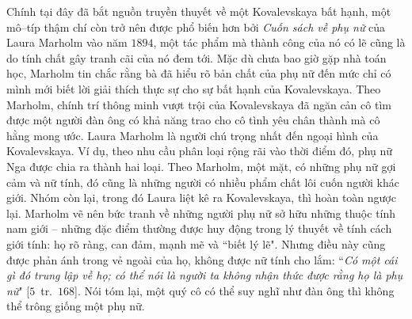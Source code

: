\begin{multicols}{2}
	Chính tại đây đã bắt nguồn truyền thuyết về một Kovalevskaya bất hạnh, một mô--típ thậm chí còn trở nên được phổ biến hơn bởi \textit{Cuốn sách về phụ nữ} của Laura Marholm vào năm $1894$, một tác phẩm mà thành công của nó có lẽ cũng là do tính chất gây tranh cãi của nó đem tới. Mặc dù chưa bao giờ gặp nhà toán học, Marholm tin chắc rằng bà đã hiểu rõ bản chất của phụ nữ đến mức chỉ có mình mới biết lời giải thích thực sự cho sự bất hạnh của Kovalevskaya. Theo Marholm, chính trí thông minh vượt trội của Kovalevskaya đã ngăn cản cô tìm được một người đàn ông có khả năng trao cho cô tình yêu chân thành mà cô hằng mong ước. Laura Marholm là người chú trọng nhất đến ngoại hình của Kovalevskaya. Ví dụ, theo nhu cầu phân loại rộng rãi vào thời điểm đó, phụ nữ Nga được chia ra thành hai loại. Theo Marholm, một mặt, có những phụ nữ gợi cảm và nữ tính, đó cũng là những người có nhiều phẩm chất lôi cuốn người khác giới. Nhóm còn lại, trong đó Laura liệt kê ra Kovalevskaya, thì hoàn toàn ngược lại. Marholm vẽ nên bức tranh về những người phụ nữ sở hữu những thuộc tính nam giới -- những đặc điểm thường được huy động trong lý thuyết về tính cách giới tính: họ rõ ràng, can đảm, mạnh mẽ và ``biết lý lẽ". Nhưng điều này cũng được phản ánh trong vẻ ngoài của họ, không được nữ tính cho lắm: ``\textit{Có một cái gì đó trung lập về họ; có thể nói là người ta không nhận thức được rằng họ là phụ nữ}" [$5$~tr.~$168$]. Nói tóm lại, một quý cô có thể suy nghĩ như đàn ông thì không thể trông giống một phụ nữ.
	\vskip 0.1cm

\end{multicols}
